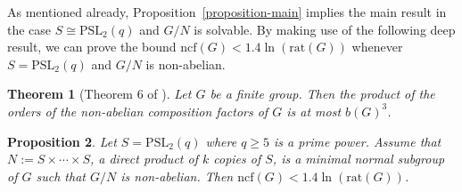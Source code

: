 \documentclass[12pt]{amsart}
\newtheorem{theorem}{Theorem}
\newtheorem{proposition}[theorem]{Proposition}
\theoremstyle{definition}
\theoremstyle{remark}
\begin{document}
As mentioned already, Proposition~\ref{proposition-main} implies the
main result in the case $S\cong {{\mathrm {PSL}}}_2(q)$ and $G/N$ is solvable. By
making use of the following deep result, we can prove the bound
${{\mathrm {ncf}}}(G)<1.4\ln({{\mathrm {rat}}}(G))$ whenever $S={{\mathrm {PSL}}}_2(q)$ and $G/N$ is
non-abelian.

\begin{theorem}[Theorem 6 of \cite{Cossey-Halasi-Maroti-Nguyen}]\label{theorem-Cossey...} Let
  $G$ be a finite group. Then the product of the orders of the
  non-abelian composition factors of $G$ is at most $b(G)^3$.
\end{theorem}

\begin{proposition}\label{proposition-main2} Let $S={{\mathrm {PSL}}}_2(q)$ where $q\geq 5$ is a prime power.
Assume that $N:=S\times\cdots\times S$, a direct product of $k$
copies of $S$, is a minimal normal subgroup of $G$ such that $G/N$
is non-abelian. Then ${{\mathrm {ncf}}}(G)<1.4\ln({{\mathrm {rat}}}(G))$.
\end{proposition}
\end{document}
